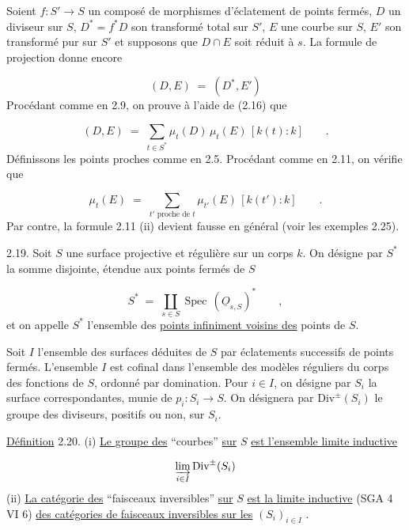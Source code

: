 Soient $f : S' \longrightarrow S$ un composé de morphismes d'éclatement de points fermés, $D$ un diviseur sur $S$, $D^* = f^* D$ son transformé total sur $S'$,
$E$ une courbe sur $S$, $E'$ son transformé pur sur $S'$ et supposons que $D \cap E$ soit réduit à $s$. La formule de projection donne encore

\begin{equation}\tag{2.16}
(D,E) \;=\; (D^*,E')
\end{equation}
Procédant comme en 2.9, on prouve à l'aide de (2.16) que

\begin{equation}\tag{2.17}
(D,E) \;=\; \sum_{t \in S^*} \mu_t(D) \, \mu_t(E) \, [k(t) : k] \qquad .
\end{equation}
Définissons les points proches comme en 2.5. Procédant comme en 2.11, on vérifie que

\begin{equation}\tag{2.18}
\mu_t(E) \;=\; \sum_{t' \text{ proche de } t} \mu_{t'}(E) \, [k(t') : k] \qquad .
\end{equation}
Par contre, la formule 2.11 (ii) devient fausse en général (voir les exemples 2.25).

2.19. Soit $S$ une surface projective et régulière sur un corps $k$. On désigne par $S^*$ la somme disjointe, étendue aux points fermés de $S$

\begin{equation*}
S^* \;=\; \coprod_{s \in S} \operatorname{Spec} \, (\underline{O}_{s,S})^* \qquad ,
\end{equation*}
et on appelle $S^*$ l'ensemble des \underline{points infiniment voisins des} points de $S$.

Soit $I$ l'ensemble des surfaces déduites de $S$ par éclatements successifs de points fermés. L'ensemble $I$ est cofinal dans l'ensemble des modèles réguliers du corps des fonctions de $S$, ordonné par domination. Pour $i \in I$, on désigne par $S_i$ la surface correspondantes, munie de $p_i : S_i \to S$. On désignera par $\mathrm{Div}^{\pm}(S_i)$ le groupe des diviseurs, positifs ou non, sur $S_i$.

\underline{Définition} 2.20. (i) \underline{Le groupe des} ``courbes'' \underline{sur} $S$ \underline{est l'ensemble limite inductive}

\begin{equation*}
\varinjlim_{i \in I} \mathrm{Div}^{\pm}(S_i)
\end{equation*}
(ii) \underline{La catégorie des} ``faisceaux inversibles'' \underline{sur} $S$ \underline{est la limite inductive}
(SGA 4 VI 6) \underline{des catégories de faisceaux inversibles sur les} $(S_i)_{i \in I}$ .

